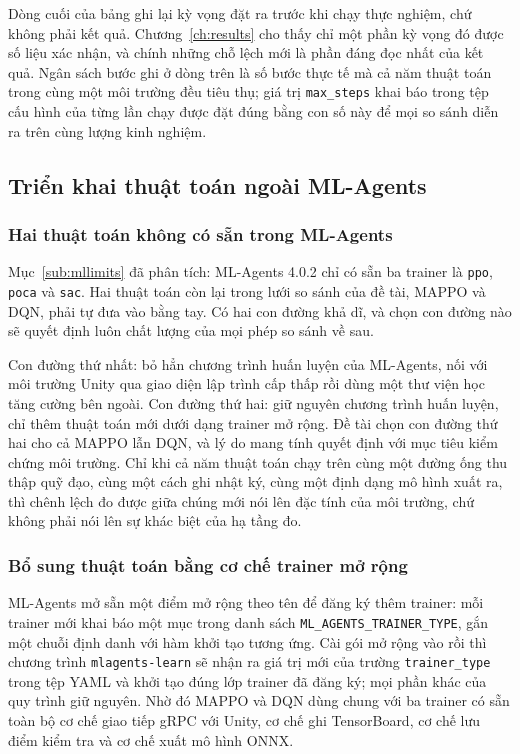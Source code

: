 \indent Dòng cuối của bảng ghi lại kỳ vọng đặt ra trước khi chạy thực nghiệm, chứ không
phải kết quả. Chương~\ref{ch:results} cho thấy chỉ một phần kỳ vọng đó được số liệu
xác nhận, và chính những chỗ lệch mới là phần đáng đọc nhất của kết quả. Ngân sách bước
ghi ở dòng trên là số bước thực tế mà cả năm thuật toán trong cùng một môi trường đều
tiêu thụ; giá trị \texttt{max\_steps} khai báo trong tệp cấu hình của từng lần chạy
được đặt đúng bằng con số này để mọi so sánh diễn ra trên cùng lượng kinh nghiệm.

\subsection{Triển khai thuật toán ngoài ML-Agents}
\label{sub:custom}

\subsubsection{Hai thuật toán không có sẵn trong ML-Agents}
\indent Mục~\ref{sub:mllimits} đã phân tích: ML-Agents 4.0.2 chỉ có sẵn ba trainer là
\texttt{ppo}, \texttt{poca} và \texttt{sac}. Hai thuật toán còn lại trong lưới so sánh của
đề tài, MAPPO và DQN, phải tự đưa vào bằng tay. Có hai con đường khả dĩ, và chọn con đường
nào sẽ quyết định luôn chất lượng của mọi phép so sánh về sau.

\indent Con đường thứ nhất: bỏ hẳn chương trình huấn luyện của ML-Agents, nối với môi
trường Unity qua giao diện lập trình cấp thấp rồi dùng một thư viện học tăng cường bên
ngoài. Con đường thứ hai: giữ nguyên chương trình huấn luyện, chỉ thêm thuật toán mới dưới
dạng trainer mở rộng. Đề tài chọn con đường thứ hai cho cả MAPPO lẫn DQN, và lý do mang
tính quyết định với mục tiêu kiểm chứng môi trường. Chỉ khi cả năm thuật toán chạy trên
cùng một đường ống thu thập quỹ đạo, cùng một cách ghi nhật ký, cùng một định dạng mô hình
xuất ra, thì chênh lệch đo được giữa chúng mới nói lên đặc tính của môi trường, chứ không phải
nói lên sự khác biệt của hạ tầng đo.

\subsubsection{Bổ sung thuật toán bằng cơ chế trainer mở rộng}
\label{sub:pyapi}
\indent ML-Agents mở sẵn một điểm mở rộng theo tên để đăng ký thêm trainer: mỗi trainer
mới khai báo một mục trong danh sách \texttt{ML\_AGENTS\_TRAINER\_TYPE}, gắn một chuỗi
định danh với hàm khởi tạo tương ứng. Cài gói mở rộng vào rồi thì chương trình
\texttt{mlagents-learn} sẽ nhận ra giá trị mới của trường \texttt{trainer\_type} trong tệp
YAML và khởi tạo đúng lớp trainer đã đăng ký; mọi phần khác của quy trình giữ nguyên. Nhờ
đó MAPPO và DQN dùng chung với ba trainer có sẵn toàn bộ cơ chế giao tiếp gRPC với Unity,
cơ chế ghi TensorBoard, cơ chế lưu điểm kiểm tra và cơ chế xuất mô hình ONNX.

